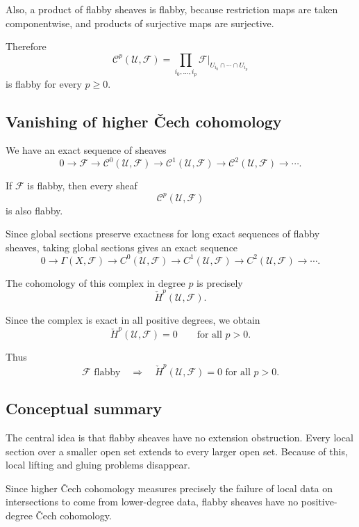 \documentclass[12pt,a4paper]{article}
\theoremstyle{notespace}
\begin{document}
Also, a product of flabby sheaves is flabby, because restriction maps are
taken componentwise, and products of surjective maps are surjective.

Therefore
\[
\mathcal C^p(\mathcal U,\mathcal F)
=
\prod_{i_0,\ldots,i_p}
\mathcal F|_{U_{i_0}\cap\cdots\cap U_{i_p}}
\]
is flabby for every $p\geq 0$.

\subsection*{Vanishing of higher \v{C}ech cohomology}

We have an exact sequence of sheaves
\[
0\longrightarrow \mathcal F
\longrightarrow \mathcal C^0(\mathcal U,\mathcal F)
\longrightarrow \mathcal C^1(\mathcal U,\mathcal F)
\longrightarrow \mathcal C^2(\mathcal U,\mathcal F)
\longrightarrow \cdots.
\]

If $\mathcal F$ is flabby, then every sheaf
\[
\mathcal C^p(\mathcal U,\mathcal F)
\]
is also flabby.

Since global sections preserve exactness for long exact sequences of flabby
sheaves, taking global sections gives an exact sequence
\[
0\longrightarrow \Gamma(X,\mathcal F)
\longrightarrow C^0(\mathcal U,\mathcal F)
\longrightarrow C^1(\mathcal U,\mathcal F)
\longrightarrow C^2(\mathcal U,\mathcal F)
\longrightarrow \cdots.
\]

The cohomology of this complex in degree $p$ is precisely
\[
\check H^p(\mathcal U,\mathcal F).
\]

Since the complex is exact in all positive degrees, we obtain
\[
\check H^p(\mathcal U,\mathcal F)=0
\qquad
\text{for all }p>0.
\]

Thus
\[
\boxed{
	\mathcal F \text{ flabby}
	\quad\Longrightarrow\quad
	\check H^p(\mathcal U,\mathcal F)=0
	\text{ for all }p>0.
}
\]

\subsection{Conceptual summary}

The central idea is that flabby sheaves have no extension obstruction.
Every local section over a smaller open set extends to every larger open
set. Because of this, local lifting and gluing problems disappear.

Since higher \v{C}ech cohomology measures precisely the failure of local
data on intersections to come from lower-degree data, flabby sheaves have no
positive-degree \v{C}ech cohomology.
\end{document}
